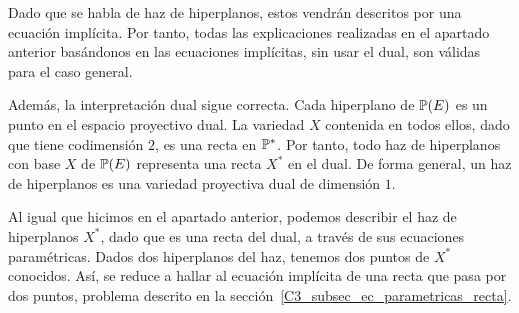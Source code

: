 Dado que se habla de haz de hiperplanos, estos vendrán descritos por una ecuación implícita. Por tanto, todas las explicaciones realizadas en el apartado anterior basándonos en las ecuaciones implícitas, sin usar el dual, son válidas para el caso general.

Además, la interpretación dual sigue correcta. Cada hiperplano de $\mathbb{P}(E)$ es un punto en el espacio proyectivo dual. La variedad $X$ contenida en todos ellos, dado que tiene codimensión $2$, es una recta en $\mathbb{P}^*$. Por tanto, todo haz de hiperplanos con base $X$ de $\mathbb{P}(E)$ representa una recta $X^*$ en el dual. De forma general, un haz de hiperplanos es una variedad proyectiva dual de dimensión $1$. 

Al igual que hicimos en el apartado anterior, podemos describir el haz de hiperplanos $X^*$, dado que es una recta del dual, a través de sus ecuaciones paramétricas. Dados dos hiperplanos del haz, tenemos dos puntos de $X^*$ conocidos. Así, se reduce a hallar al ecuación implícita de una recta que pasa por dos puntos, problema descrito en la sección~\ref{C3_subsec_ec_parametricas_recta}.

